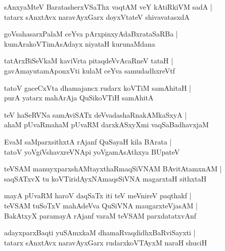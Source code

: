\documentclass[twoside,12pt,openright]{book}
\newcounter{shloka}[chapter]
\begin{document}
\begin{shloka}
sAnxyaMteV BaratasherxVSaThx vaqtAM veY kAtiRkiVM sadA |\\
tatarx sAnxtAvx naravAyxGarx doyxVtateV shivavatasxdA
\end{shloka}

\begin{shloka}
goVsahasarxPalaM ceYva pArxpinxyAdaBxrataSaRBa |\\
kumArakoVTimAsAdayx niyataH kurunaMdana 
\end{shloka}

\begin{shloka}
tatArxBiSeVkaM kaviVrta pitaqdeVvAcaRneV tataH |\\
gavAmayutamAponxVti kulaM ceYva samudadhxreVtf 
\end{shloka}

\begin{shloka}
tatoV gaceCxVta dhamajancx rudarx koVTiM samAhitaH |\\
purA yatarx mahArAja QuSikoVTiH samAhitA 
\end{shloka}

\begin{shloka}
teV haSeRVNa samAviSATx deVvadashaRnakAMkaSxyA |\\
ahaM pUvaRmahaM pUvaRM darxkASxyXmi vaqSaBadhavxjaM 
\end{shloka}

\begin{shloka}
EvaM saMparxsithxtA rAjanf QuSayaH kila BArata |\\
tatoV yoVgiVshavxreVNApi yoVgamAsAthxya BUpateV  
\end{shloka}

\begin{shloka}
teVSAM manuyxparxshAMtayxthaRmaqSiVNAM BAvitAtamxnAM |\\
saqSATxvX tu koVTiridAyxNAmaqsSiVNA magarxtaH sithxtaH 
\end{shloka}

\begin{shloka}
mayA pUvaRM haroV daqSaTx iti teV meVnireV paqthakf |\\
teVSAM tuSoTxV mahAdeVva QuSiVNA maugarxteVjasAM |\\
BakAtxyX paramayA rAjanf varaM teVSAM parxdatatxvAnf 
\end{shloka}

\begin{shloka}
adayxparxBaqti yuSAmxkaM dhamaRvaqdidhxBaRviSayxti |\\
tatarx sAnxtAvx naravAyxGarx rudarxkoVTAyxM naraH shuciH 
\end{shloka}
\end{document}
